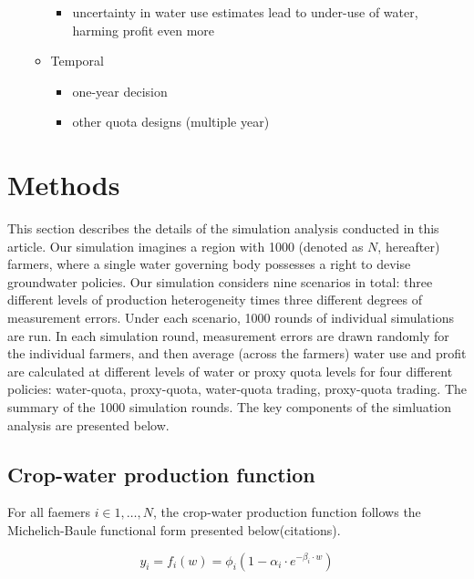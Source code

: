 \documentclass[
  letterpaper,
  DIV=11,
  numbers=noendperiod]{scrartcl}
\providecommand{\tightlist}{%
  \setlength{\itemsep}{0pt}\setlength{\parskip}{0pt}}\usepackage{longtable,booktabs,array}
\begin{document}
\begin{itemize}
\begin{itemize}
    \begin{itemize}
    \tightlist
    \item
      uncertainty in water use estimates lead to under-use of water,
      harming profit even more
    \end{itemize}
  \item
    Temporal

    \begin{itemize}
    \tightlist
    \item
      one-year decision
    \item
      other quota designs (multiple year)
    \end{itemize}
  \end{itemize}
\end{itemize}

\section{Methods}\label{methods}

This section describes the details of the simulation analysis conducted
in this article. Our simulation imagines a region with 1000 (denoted as
\(N\), hereafter) farmers, where a single water governing body possesses
a right to devise groundwater policies. Our simulation considers nine
scenarios in total: three different levels of production heterogeneity
times three different degrees of measurement errors. Under each
scenario, 1000 rounds of individual simulations are run. In each
simulation round, measurement errors are drawn randomly for the
individual farmers, and then average (across the farmers) water use and
profit are calculated at different levels of water or proxy quota levels
for four different policies: water-quota, proxy-quota, water-quota
trading, proxy-quota trading. The summary of the 1000 simulation rounds.
The key components of the simluation analysis are presented below.

\subsection{Crop-water production
function}\label{crop-water-production-function}

For all faemers \(i \in 1,\dots, N\), the crop-water production function
follows the Michelich-Baule functional form presented below(citations).

\begin{equation}
y_i = f_i(w) = \phi_i (1 - \alpha_i \cdot e^{-\beta_i\cdot w})
\end{equation}
\end{document}
